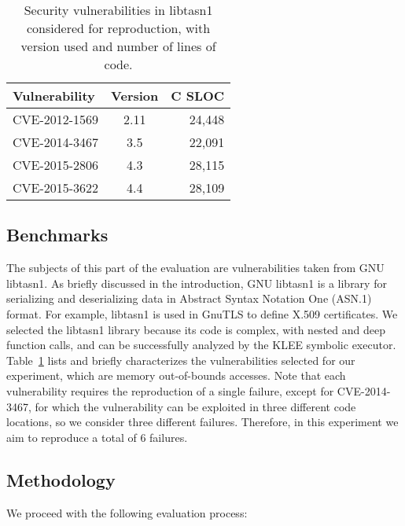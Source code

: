 \begin{table}[tbp]
  \caption{Security vulnerabilities in \textsf{libtasn1} considered
    for reproduction, with version used and number of lines of code.}
\begin{tabular}{|l|c|r|}
  \hline
  \textbf{Vulnerability} & \textbf{Version} & \textbf{C SLOC} \\ \hline
  CVE-2012-1569 & 2.11& 24,448 \\ \hline
  CVE-2014-3467 & 3.5 & 22,091 \\ \hline
  CVE-2015-2806 & 4.3 & 28,115 \\ \hline
  CVE-2015-3622 & 4.4 & 28,109 \\ \hline
\end{tabular}
\label{tab:vuln-stats}
\end{table}

\subsection{Benchmarks}
The subjects of this part of the evaluation are
vulnerabilities taken from GNU \textsf{libtasn1}. As briefly discussed
in the introduction, GNU \textsf{libtasn1} is a library for
serializing and deserializing data in Abstract Syntax Notation One
(ASN.1) format.  For example, \textsf{libtasn1} is used in GnuTLS to
define X.509 certificates.  We selected the \textsf{libtasn1} library
because its code is complex, with nested and deep function calls, and
can be successfully analyzed by the KLEE symbolic executor.
Table~\ref{tab:vuln-stats} lists and briefly characterizes the
vulnerabilities selected for our experiment, which are memory
out-of-bounds accesses.  Note that each vulnerability requires the
reproduction of a single failure, except for CVE-2014-3467, for which
the vulnerability can be exploited in three different code locations,
so we consider three different failures.  Therefore, in this
experiment we aim to reproduce a total of 6 failures.

\subsection{Methodology}
We proceed with the following evaluation process:

